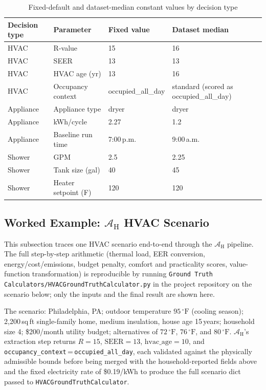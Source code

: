 \documentclass[11pt]{article}
\begin{document}
\begin{table}[htbp]
\centering
\footnotesize
\caption{Fixed-default and dataset-median constant values by decision type}
\label{tab:fixed_default_constants}
\begin{tabular}{@{}llll@{}}
\toprule
Decision type & Parameter & Fixed value & Dataset median \\
\midrule
HVAC & R-value & 15 & 16 \\
HVAC & SEER & 13 & 13 \\
HVAC & HVAC age (yr) & 13 & 16 \\
HVAC & Occupancy context & occupied\_all\_day & standard (scored as occupied\_all\_day) \\
Appliance & Appliance type & dryer & dryer \\
Appliance & kWh/cycle & 2.27 & 1.2 \\
Appliance & Baseline run time & 7:00\,p.m. & 9:00\,a.m. \\
Shower & GPM & 2.5 & 2.25 \\
Shower & Tank size (gal) & 40 & 45 \\
Shower & Heater setpoint (\textdegree{}F) & 120 & 120 \\
\bottomrule
\end{tabular}
\end{table}

\subsection{Worked Example: \texorpdfstring{$\mathcal{A}_{\text{H}}$}{A\_H} HVAC Scenario}
\label{app:hvac_worked}

This subsection traces one HVAC scenario end-to-end through the
$\mathcal{A}_{\text{H}}$ pipeline. The full step-by-step arithmetic
(thermal load, EER conversion, energy/cost/emissions, budget penalty,
comfort and practicality scores, value-function transformation) is
reproducible by running \texttt{Ground Truth Calculators/HVACGroundTruthCalculator.py}
in the project repository on the scenario below; only the inputs and the
final result are shown here.

The scenario: Philadelphia, PA; outdoor temperature $95\,^\circ\text{F}$
(cooling season); 2{,}200\,sq\,ft single-family home, medium insulation,
house age 15\,years; household size 4; \$200/month utility budget;
alternatives of $72\,^\circ\text{F}$, $76\,^\circ\text{F}$, and
$80\,^\circ\text{F}$. $\mathcal{A}_{\text{H}}$'s extraction step returns
$R=15$, $\text{SEER}=13$, $\text{hvac\_age}=10$, and
\texttt{occupancy\_context}\,=\,\texttt{occupied\_all\_day}, each validated
against the physically admissible bounds
before being merged with the household-reported fields above and the fixed
electricity rate of \$0.19/kWh to produce the full scenario dict passed to
\texttt{HVACGroundTruthCalculator}.
\end{document}
